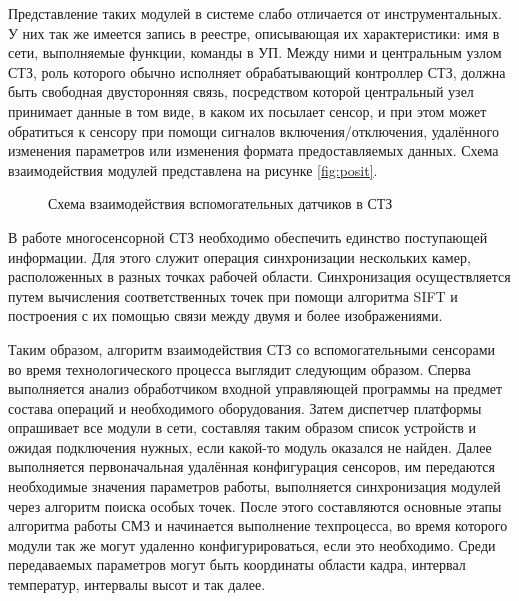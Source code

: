 Представление таких модулей в системе слабо отличается от инструментальных. У них так же имеется запись в реестре, описывающая их характеристики: имя в сети, выполняемые функции, команды в УП. Между ними и центральным узлом СТЗ, роль которого обычно исполняет обрабатывающий контроллер СТЗ, должна быть свободная двусторонняя связь, посредством которой центральный узел принимает данные в том виде, в каком их посылает сенсор, и при этом может обратиться к сенсору при помощи сигналов включения/отключения, удалённого изменения параметров или изменения формата предоставляемых данных. Схема взаимодействия модулей представлена на рисунке \cref{fig:posit}.

\begin{figure}[ht]
	\caption{Схема взаимодействия вспомогательных датчиков в СТЗ}\label{fig:dop-scheme}
\end{figure}

В работе многосенсорной СТЗ необходимо обеспечить единство поступающей информации. Для этого служит операция синхронизации нескольких камер, расположенных в разных точках рабочей области. Синхронизация осуществляется путем вычисления соответственных точек при помощи алгоритма SIFT и построения с их помощью связи между двумя и более изображениями.

Таким образом, алгоритм взаимодействия СТЗ со вспомогательными сенсорами во время технологического процесса выглядит следующим образом. Сперва выполняется анализ обработчиком входной управляющей программы на предмет состава операций и необходимого оборудования. Затем диспетчер платформы опрашивает все модули в сети, составляя таким образом список устройств и ожидая подключения нужных, если какой-то модуль оказался не найден. Далее выполняется первоначальная удалённая конфигурация сенсоров, им передаются необходимые значения параметров работы, выполняется синхронизация модулей через алгоритм поиска особых точек. После этого составляются основные этапы алгоритма работы СМЗ и начинается выполнение техпроцесса, во время которого модули так же могут удаленно конфигурироваться, если это необходимо. Среди передаваемых параметров могут быть координаты области кадра, интервал температур, интервалы высот и так далее.

